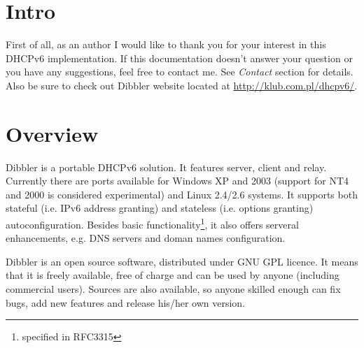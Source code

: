 
\section{Intro}
First of all, as an author I would like to thank you for your interest
in this DHCPv6 implementation. If this documentation doesn't answer
your question or you have any suggestions, feel free to contact
me. See \emph{Contact} section for details. Also be sure to check out
Dibbler website located at \url{http://klub.com.pl/dhcpv6/}.


\section{Overview}

Dibbler is a portable DHCPv6 solution. It features server, client and
relay. Currently there are ports available for Windows XP and 2003 (support for
NT4 and 2000 is considered experimental) and Linux 2.4/2.6 systems. 
It supports both stateful (i.e. IPv6 address
granting) and stateless (i.e. options granting) autoconfiguration.
Besides basic functionality\footnote{specified in RFC3315}, it also offers
serveral enhancements, e.g. DNS servers and doman names
configuration.

Dibbler is an open source software, distributed under GNU GPL
licence. It means that it is freely available, free of charge and can
be used by anyone (including commercial users). Sources are also
available, so anyone skilled enough can fix bugs, add new features and
release his/her own version.


